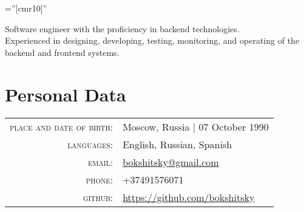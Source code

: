 \documentclass[a4paper,10pt]{article}
\begin{document}
\pagestyle{empty}

\font\fb=''[cmr10]''

\par{\bigskip\par}

Software engineer with the proficiency in backend technologies. \\
Experienced in designing, developing, testing, monitoring, and operating of the backend and frontend systems.

\section{Personal Data}
\begin{tabular}{rl}
  \textsc{place and date of birth:} & Moscow, Russia | 07 October 1990 \\
  \textsc{languages:} & English, Russian, Spanish \\
  \textsc{email:} & \href{mailto:bokshitsky@gmail.com}{bokshitsky@gmail.com} \\
  \textsc{phone:} & +37491576071 \\
  \textsc{github:} & \href{https://github.com/bokshitsky}{https://github.com/bokshitsky} \\
\end{tabular}
\end{document}
